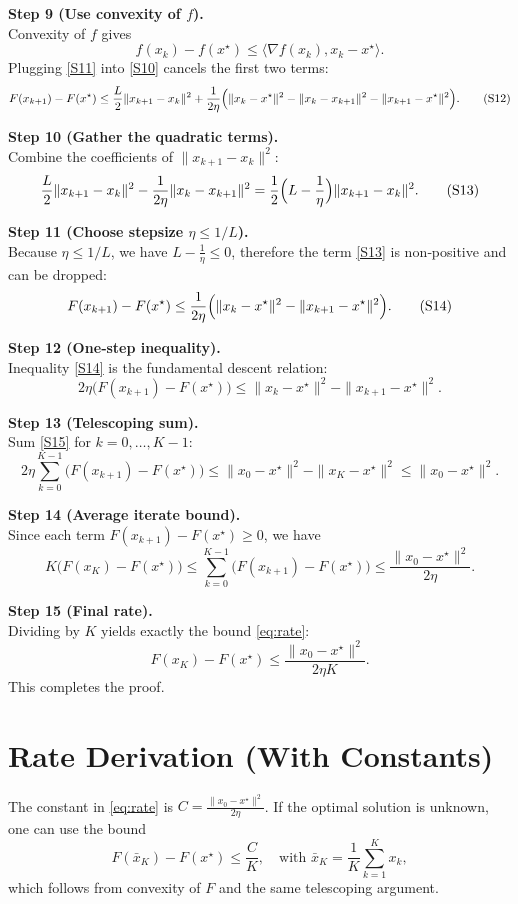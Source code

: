 \documentclass{article}
\begin{document}
\begin{enumerate}
\noindent\textbf{Step 9 (Use convexity of $f$).}\\
Convexity of $f$ gives
\[
f(x_{k})-f(x^{\star})\le\langle\nabla f(x_{k}),x_{k}-x^{\star}\rangle .
\tag{S11}
\]
Plugging \eqref{S11} into \eqref{S10} cancels the first two terms:
\[
F(x_{k+1})-F(x^{\star})
\le \frac{L}{2}\|x_{k+1}-x_{k}\|^{2}
+\frac{1}{2\eta}\Bigl(\|x_{k}-x^{\star}\|^{2}-\|x_{k}-x_{k+1}\|^{2}-\|x_{k+1}-x^{\star}\|^{2}\Bigr).
\tag{S12}
\]

\noindent\textbf{Step 10 (Gather the quadratic terms).}\\
Combine the coefficients of $\|x_{k+1}-x_{k}\|^{2}$:
\[
\frac{L}{2}\|x_{k+1}-x_{k}\|^{2}-\frac{1}{2\eta}\|x_{k}-x_{k+1}\|^{2}
=\frac{1}{2}\Bigl(L-\frac{1}{\eta}\Bigr)\|x_{k+1}-x_{k}\|^{2}.
\tag{S13}
\]

\noindent\textbf{Step 11 (Choose stepsize $\eta\le 1/L$).}\\
Because $\eta\le 1/L$, we have $L-\frac{1}{\eta}\le0$, therefore the term \eqref{S13} is non‑positive and can be dropped:
\[
F(x_{k+1})-F(x^{\star})\le
\frac{1}{2\eta}\Bigl(\|x_{k}-x^{\star}\|^{2}-\|x_{k+1}-x^{\star}\|^{2}\Bigr).
\tag{S14}
\]

\noindent\textbf{Step 12 (One‑step inequality).}\\
Inequality \eqref{S14} is the fundamental descent relation:
\[
\boxed{\;
2\eta\bigl(F(x_{k+1})-F(x^{\star})\bigr)
\le\|x_{k}-x^{\star}\|^{2}-\|x_{k+1}-x^{\star}\|^{2}.
\;}
\tag{S15}
\]

\noindent\textbf{Step 13 (Telescoping sum).}\\
Sum \eqref{S15} for $k=0,\dots, K-1$:
\[
2\eta\sum_{k=0}^{K-1}\bigl(F(x_{k+1})-F(x^{\star})\bigr)
\le\|x_{0}-x^{\star}\|^{2}-\|x_{K}-x^{\star}\|^{2}
\le\|x_{0}-x^{\star}\|^{2}.
\tag{S16}
\]

\noindent\textbf{Step 14 (Average iterate bound).}\\
Since each term $F(x_{k+1})-F(x^{\star})\ge0$, we have
\[
K\bigl(F(x_{K})-F(x^{\star})\bigr)
\le\sum_{k=0}^{K-1}\bigl(F(x_{k+1})-F(x^{\star})\bigr)
\le\frac{\|x_{0}-x^{\star}\|^{2}}{2\eta}.
\tag{S17}
\]

\noindent\textbf{Step 15 (Final rate).}\\
Dividing by $K$ yields exactly the bound \eqref{eq:rate}:
\[
F(x_{K})-F(x^{\star})\le\frac{\|x_{0}-x^{\star}\|^{2}}{2\eta K}.
\tag{S18}
\]
This completes the proof.

\section*{Rate Derivation (With Constants)}
The constant in \eqref{eq:rate} is $C=\frac{\|x_{0}-x^{\star}\|^{2}}{2\eta}$.  
If the optimal solution is unknown, one can use the bound
\[
F(\bar x_{K})-F(x^{\star})\le\frac{C}{K},
\quad\text{with }\bar x_{K}=\frac1K\sum_{k=1}^{K}x_{k},
\]
which follows from convexity of $F$ and the same telescoping argument.


\end{enumerate}
\end{document}
